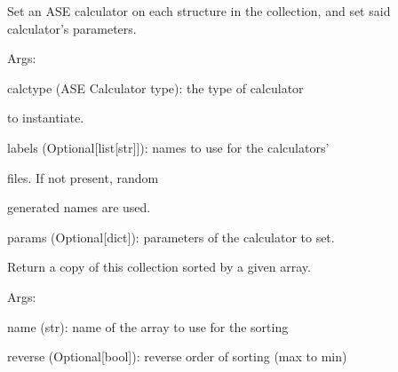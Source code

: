 \documentclass[letterpaper,10pt,english]{sphinxmanual}
\begin{document}
\begin{fulllineitems}
\begin{fulllineitems}
\label{doctree/soprano.collection.collection:soprano.collection.collection.AtomsCollection.set_calculators}
Set an ASE calculator on each structure in the collection,
and set said calculator's parameters.

\begin{DUlineblock}{0em}
\item[] Args:
\item[]
\begin{DUlineblock}{\DUlineblockindent}
\item[] calctype (ASE Calculator type): the type of calculator
\item[]
\begin{DUlineblock}{\DUlineblockindent}
\item[] to instantiate.
\end{DUlineblock}
\item[] labels (Optional{[}list{[}str{]}{]}): names to use for the calculators'
\item[]
\begin{DUlineblock}{\DUlineblockindent}
\item[] files. If not present, random
\item[] generated names are used.
\end{DUlineblock}
\item[] params (Optional{[}dict{]}): parameters of the calculator to set.
\end{DUlineblock}
\end{DUlineblock}

\end{fulllineitems}


\begin{fulllineitems}
\label{doctree/soprano.collection.collection:soprano.collection.collection.AtomsCollection.sorted_byarray}
Return a copy of this collection sorted by a given array.

\begin{DUlineblock}{0em}
\item[] Args:
\item[]
\begin{DUlineblock}{\DUlineblockindent}
\item[] name (str): name of the array to use for the sorting
\item[] reverse (Optional{[}bool{]}): reverse order of sorting (max to min)
\end{DUlineblock}
\end{DUlineblock}


\end{fulllineitems}
\end{fulllineitems}
\end{document}
